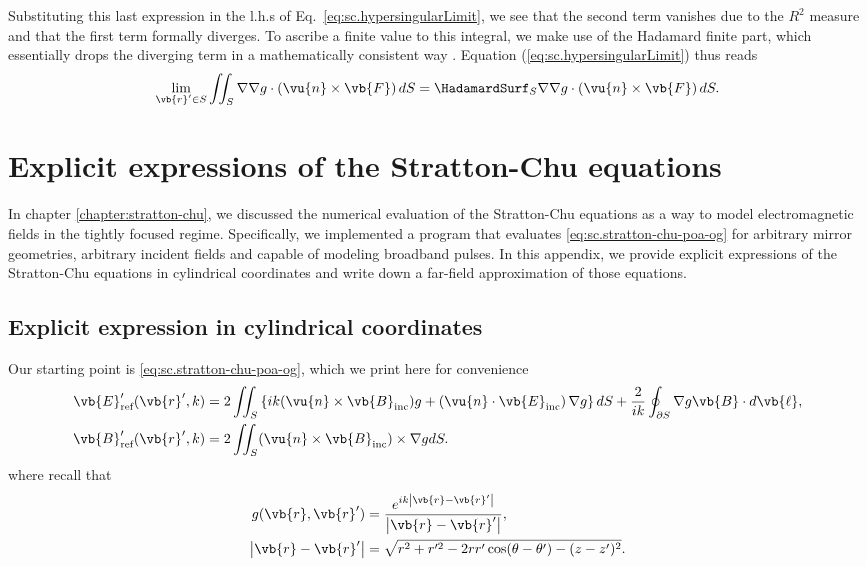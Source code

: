 \documentclass[11pt,SymmetricalJury]{inrsthesis/inrsthesis}
\begin{document}
Substituting this last expression in the l.h.s of Eq.~\eqref{eq:sc.hypersingularLimit},
we see that the second term vanishes due to the $R^2$ measure and that the
first term formally diverges. To ascribe a finite value to this integral,
we make use of the Hadamard finite part, which essentially drops the diverging term
in a mathematically consistent way \cite{Blanchet2000}.
Equation (\ref{eq:sc.hypersingularLimit}) thus reads
  \begin{equation}
    \lim_{\vb{r}'\in S} \iint_S \nabla\nabla g \cdot\left(\vu{n}\times\vb{F}\right)dS
     = \HadamardSurf_S \nabla\nabla g\cdot\left(\vu{n}\times\vb{F}\right)dS.
  \end{equation}

\chapter{Explicit expressions of the Stratton-Chu equations}
\label{app.explicit-sc}

In chapter \ref{chapter:stratton-chu}, we discussed the numerical evaluation
of the Stratton-Chu equations as a way to model electromagnetic fields in the
tightly focused regime. Specifically, we implemented a program that evaluates
\eqref{eq:sc.stratton-chu-poa-og} for arbitrary mirror geometries, arbitrary incident fields and capable
of modeling broadband pulses. In this appendix, we provide explicit expressions
of the Stratton-Chu equations in cylindrical coordinates and write down a far-field
approximation of those equations.

\section{Explicit expression in cylindrical coordinates}

Our starting point is \eqref{eq:sc.stratton-chu-poa-og}, which we print here for convenience
  \begin{subequations}
  \label{eq:app.sc-explicit.poa-og}
  \begin{align}
    \label{eq:app.sc-explicit.poa-og.efield}
    \vb{E}'_\text{ref}(\vb{r}',k)  &= 2\iint_S
      \left\{
        ik(\vu{n}\times\vb{B}_\text{inc})g
        +\left(\vu{n}\cdot\vb{E}_\text{inc}\right)\nabla g\right\}dS
            + \frac{2}{ik}\oint_{\partial S}\nabla g
                    \vb{B}\cdot d\vb{\ell},\\
    \label{eq:app.sc-explicit.poa-og.bfield}
    \vb{B}'_\text{ref}(\vb{r}',k)  &= 2\iint_S (\vu{n}\times\vb{B}_\text{inc})\times\nabla g dS.
  \end{align}
  \end{subequations}
where recall that
  \begin{align}
    g(\vb{r},\vb{r}') &= \frac{e^{ik\left|\vb{r}-\vb{r}'\right|}}{\left|\vb{r}-\vb{r}'\right|}, \\
    \left|\vb{r}-\vb{r}'\right| &= \sqrt{r^2+r'^2-2rr'\cos(\theta-\theta')-(z-z')^2}.
  \end{align}
\end{document}
